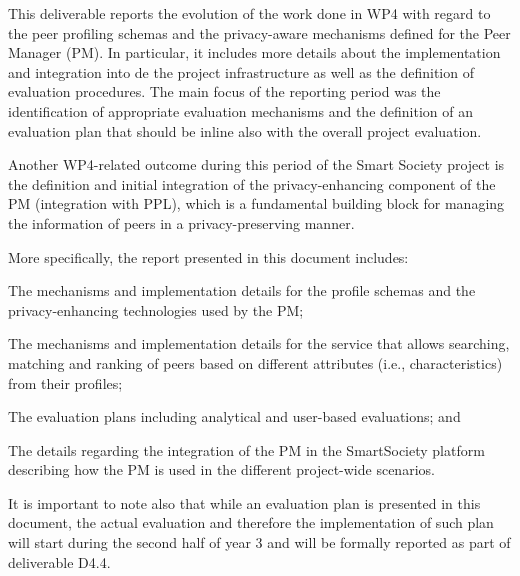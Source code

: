 
This deliverable reports the evolution of the work done in WP4 with regard to the peer profiling schemas and the privacy-aware mechanisms defined for the Peer Manager (PM). In particular, it includes more details about the implementation and integration into de the project infrastructure as well as the definition of evaluation procedures. 
The main focus of the reporting period was the identification of appropriate evaluation mechanisms and the definition of an evaluation plan that should be inline also with the overall project evaluation.

Another WP4-related outcome during this period of the Smart Society project is the definition and initial integration of the privacy-enhancing component of the PM (integration with PPL), which is a fundamental building block for managing the information of peers in a privacy-preserving manner. 

More specifically, the report presented in this document includes:
\begin{inparaenum}[\itshape (i)]
\item The mechanisms and implementation details for the profile schemas and the privacy-enhancing technologies used by the PM;
\item The mechanisms and implementation details for the service that allows searching, matching and ranking of peers based on different attributes (i.e., characteristics) from their profiles;
\item The evaluation plans including analytical and user-based evaluations; and
\item The details regarding the integration of the PM in the SmartSociety platform describing how the PM is used in the different project-wide scenarios.
\end{inparaenum}


It is important to note also that while an evaluation plan is presented in this document, the actual evaluation and therefore the implementation of such plan will start during the second half of year 3 and will be formally reported as part of deliverable D4.4.